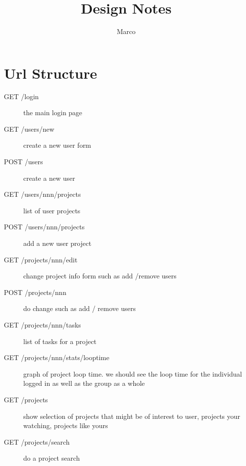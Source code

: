 \documentclass{article}
\title{Design Notes}
\author{Marco}
\begin{document}
\maketitle
\tableofcontents
\section{Url Structure}
\begin{description}
\item[GET /login] the main login page
\item[GET /users/new] create a new user form
\item[POST /users] create a new user
\item[GET /users/nnn/projects] list of user projects
\item[POST /users/nnn/projects] add a new user project
\item[GET /projects/nnn/edit] change project info form such as add /remove users
\item[POST /projects/nnn] do change such as add / remove users
\item[GET /projects/nnn/tasks] list of tasks for a project
\item[GET /projects/nnn/stats/looptime] graph of project loop time. we should see the loop time for 
the individual logged in as well as the group as a whole
\item[GET /projects] show selection of projects that might be of interest to user, projects your watching,
projects like yours
\item[GET /projects/search] do a project search

\end{description}
\end{document}
